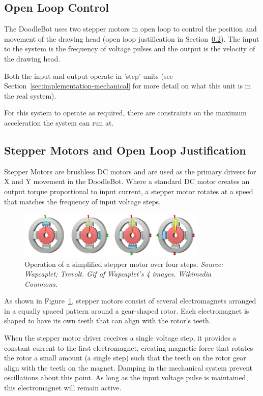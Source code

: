 \subsection{Open Loop Control}
	The DoodleBot uses two stepper motors in open loop to control the position and movement of the drawing head (open loop justification in Section~\ref{sec:control-stepper}). The input to the system is the frequency of voltage pulses and the output is the velocity of the drawing head. 
	
	Both the input and output operate in 'step' units (see Section~\ref*{sec:implementation-mechanical} for more detail on what this unit is in the real system).
	
	For this system to operate as required, there are constraints on the maximum acceleration the system can run at.
	
\subsection{Stepper Motors and Open Loop Justification}
		\label{sec:control-stepper}
			
		Stepper Motors are brushless DC motors and are used as the primary drivers for X and Y movement in the DoodleBot. Where a standard DC motor creates an output torque proportional to input current, a stepper motor rotates at a speed that matches the frequency of input voltage steps.
		
		\begin{figure}[h]
			\centering
			\includegraphics[width=0.8\textwidth]{figures/optimisation/steppermotor}
			\caption{Operation of a simplified stepper motor over four steps. \textit{Source: Wapcaplet; Trevolt. Gif of Wapcaplet's 
			4 images. Wikimedia Commons.\cite{website:stepper}}}
			\label{fig:stepper}
		\end{figure}
		
		As shown in Figure~\ref{fig:stepper}, stepper motors consist of several electromagnets arranged in a equally spaced pattern around a gear-shaped rotor. Each electromagnet is shaped to have its own teeth that can align with the rotor's teeth. 
		
		When the stepper motor driver receives a single voltage step, it provides a constant current to the first electromagnet, creating magnetic force that rotates the rotor a small amount (a single step) such that the teeth on the rotor gear align with the teeth on the magnet. Damping in the mechanical system prevent oscillations about this point. As long as the input voltage pulse is maintained, this electromagnet will remain active.
		
